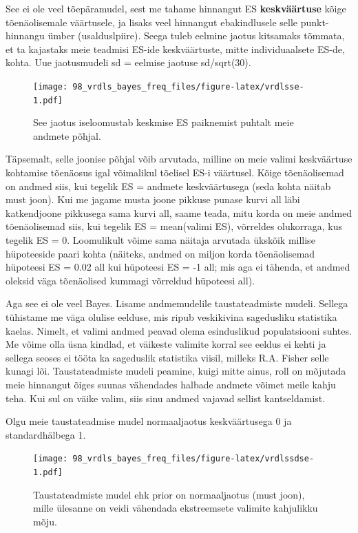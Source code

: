 \documentclass[]{book}
\begin{document}
See ei ole veel tõepäramudel, sest me tahame hinnangut ES \textbf{keskväärtuse} kõige tõenäolisemale väärtusele, ja lisaks veel hinnangut ebakindlusele selle punkt-hinnangu ümber (usalduslpiire).
Seega tuleb eelmine jaotus kitsamaks tõmmata, et ta kajastaks meie teadmisi ES-ide keskväärtuste, mitte individuaalsete ES-de, kohta.
Uue jaotusmudeli sd = eelmise jaotuse sd/sqrt(30).

\begin{figure}
\centering
\texttt{[image: 98\_vrdls\_bayes\_freq\_files/figure-latex/vrdlsse-1.pdf]}
\caption{\label{fig:vrdlsse}See jaotus iseloomustab keskmise ES paiknemist puhtalt meie andmete põhjal.}
\end{figure}

Täpsemalt, selle joonise põhjal võib arvutada, milline on meie valimi keskväärtuse kohtamise tõenäosus igal võimalikul tõelisel ES-i väärtusel.
Kõige tõenäolisemad on andmed siis, kui tegelik ES = andmete keskväärtusega (seda kohta näitab must joon).
Kui me jagame musta joone pikkuse punase kurvi all läbi katkendjoone pikkusega sama kurvi all, saame teada, mitu korda on meie andmed tõenäolisemad siis, kui tegelik ES = mean(valimi ES), võrreldes olukorraga, kus tegelik ES = 0.
Loomulikult võime sama näitaja arvutada ükskõik millise hüpoteeside paari kohta (näiteks, andmed on miljon korda tõenäolisemad hüpoteesi ES = 0.02 all kui hüpoteesi ES = -1 all; mis aga ei tähenda, et andmed oleksid väga tõenäolised kummagi võrreldud hüpoteesi all).

Aga see ei ole veel Bayes.
Lisame andmemudelile taustateadmiste mudeli.
Sellega tühistame me väga olulise eelduse, mis ripub veskikivina sagedusliku statistika kaelas.
Nimelt, et valimi andmed peavad olema esinduslikud populatsiooni suhtes.
Me võime olla üsna kindlad, et väikeste valimite korral see eeldus ei kehti ja sellega seoses ei tööta ka sageduslik statistika viisil, milleks R.A. Fisher selle kunagi lõi.
Taustateadmiste mudeli peamine, kuigi mitte ainus, roll on mõjutada meie hinnangut õiges suunas vähendades halbade andmete võimet meile kahju teha.
Kui sul on väike valim, siis sinu andmed vajavad sellist kantseldamist.

Olgu meie taustateadmise mudel normaaljaotus keskväärtusega 0 ja standardhälbega 1.

\begin{figure}
\centering
\texttt{[image: 98\_vrdls\_bayes\_freq\_files/figure-latex/vrdlssdse-1.pdf]}
\caption{\label{fig:vrdlssdse}Taustateadmiste mudel ehk prior on normaaljaotus (must joon), mille ülesanne on veidi vähendada ekstreemsete valimite kahjulikku mõju.}
\end{figure}
\end{document}
